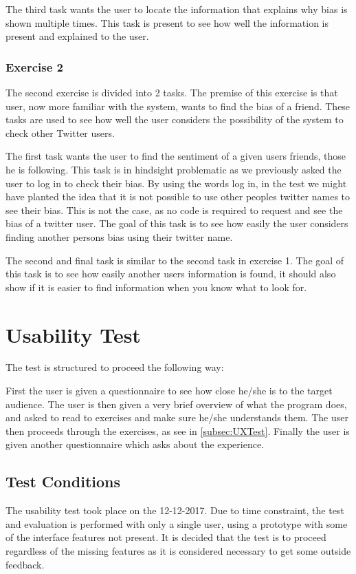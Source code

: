 The third task wants the user to locate the information that explains why bias
is shown multiple times. This task is present to see how well the information
is present and explained to the user.

\subsubsection{Exercise 2}
The second exercise is divided into 2 tasks. The premise of this exercise is
that user, now more familiar with the system, wants to find the bias of a
friend. These tasks are used to see how well the user considers the possibility
of the system to check other Twitter users.\nl

The first task wants the user to find the sentiment of a given users
friends, those he is following. This task is in hindsight problematic as we
previously asked the user to log in to check their bias. By using the words log
in, in the test we might have planted the idea that it is not possible to use
other peoples twitter names to see their bias. This is not the case, as no code
is required to request and see the bias of a twitter user. The goal of this task
is to see how easily the user considers finding another persons bias using
their twitter name.\nl

The second and final task is similar to the second task in exercise 1. The goal
of this task is to see how easily another users information is found, it should
also show if it is easier to find information when you know what to look for.


\section{Usability Test}\label{sec:UXUT}
The test is structured to proceed the following way:\nl

First the user is given a questionnaire to see how close he/she is to the target
audience. The user is then given a very brief overview of what the program
does, and asked to read to exercises and make sure he/she understands them. The
user then proceeds through the exercises, as see in \autoref{subsec:UXTest}.
Finally the user is given another questionnaire which asks about the experience.

\subsection{Test Conditions}
The usability test took place on the 12-12-2017. Due to time constraint, the
test and evaluation is performed with only a single user, using a prototype
with some of the interface features not present. It is decided that the test is
to proceed regardless of the missing features as it is considered necessary to
get some outside feedback.\nl

